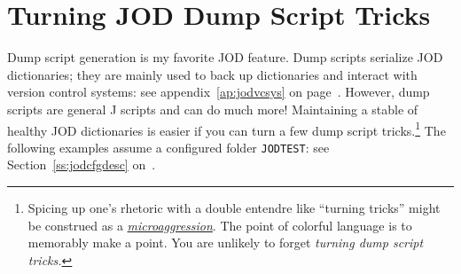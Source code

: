 \section{Turning JOD Dump Script Tricks}\label{ap:joddumptricks}

Dump script generation is my favorite JOD feature. Dump scripts serialize 
JOD dictionaries; they are mainly used to back up dictionaries and interact with 
version control systems: see appendix~\ref{ap:jodvcsys} on page~\pageref{ap:jodvcsys}.
However, dump scripts are general J scripts and can do much more!  
Maintaining a stable of healthy JOD dictionaries is easier 
if you can turn a few dump script tricks.\footnote{Spicing up one's rhetoric with a double entendre 
like ``turning tricks'' might be construed as a 
\href{http://thefederalist.com/2015/03/24/microaggressions-and-trigger-warnings-meet-real-trauma/}{\emph{microaggression}}. 
The point of colorful language is to memorably make a point. 
You are unlikely to forget \emph{turning dump script tricks.} 
} The following examples assume a configured folder \verb|JODTEST|: see Section~\ref{ss:jodcfgdesc} on~\pageref{ss:jodcfgdesc}.

